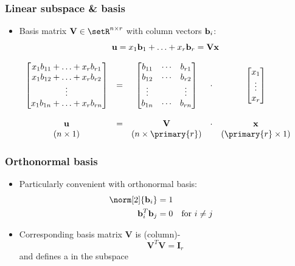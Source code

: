 \documentclass[t]{beamer} %
\begin{document}
\begin{frame}
  \frametitle{Linear subspace \& basis}
  
  \begin{itemize}
  \item Basis matrix $\mathbf{V} \in \setR^{n\times r}$ with column vectors $\vb_i$:
    \[
    \vu = x_1 \vb_1 + \ldots + x_r \vb_r = \mathbf{V} \vx
    \]
  \end{itemize}

  \[
  \begin{array}{ccccc}
    \begin{bmatrix}
      x_1 b_{11} + \ldots + x_r b_{r1} \\
      x_1 b_{12} + \ldots + x_r b_{r2} \\
      \vdots\\
      x_1 b_{1n} + \ldots + x_r b_{rn}
    \end{bmatrix}
    & = &
    \begin{bmatrix}
      b_{11} & \cdots & b_{r1} \\
      b_{12} & \cdots & b_{r2} \\
      \vdots & & \vdots \\
      b_{1n} & \cdots & b_{rn}
    \end{bmatrix}
    & \cdot &
    \begin{bmatrix}
      x_1 \\
      \vdots \\
      x_r
    \end{bmatrix} \\
    \\
    \mathbf{u} & = & \mathbf{V} & \cdot & \mathbf{x} \\
    (n\times 1) & & (n\times \primary{r}) & & (\primary{r}\times 1)
  \end{array}
  \]

\end{frame}

\begin{frame}
  \frametitle{Orthonormal basis}

  \begin{itemize}
  \item Particularly convenient with orthonormal basis:
    \begin{align*}
      \norm[2]{\vb_i} &= 1 \\
      \vb_i^T \vb_j &= 0 && \text{for } i\neq j
    \end{align*}
  \item Corresponding basis matrix $\mathbf{V}$ is (column)-
    \[
      \mathbf{V}^T \mathbf{V} = \mathbf{I}_r
    \]
    and defines a  in the subspace
  \end{itemize}
\end{frame}
\end{document}
